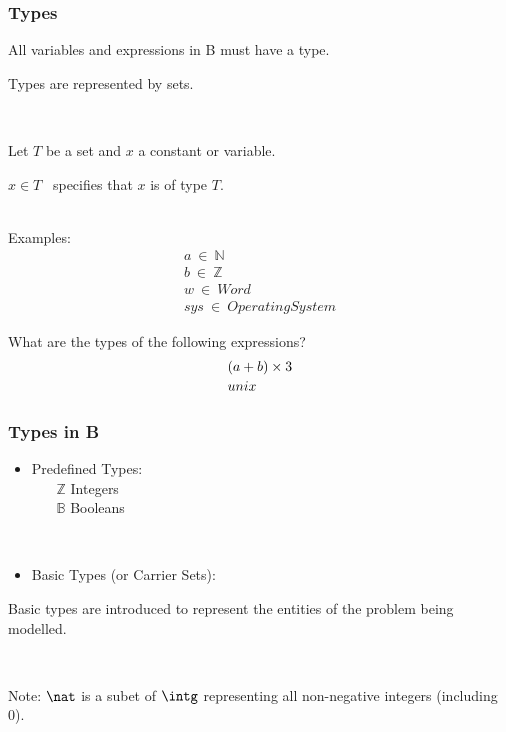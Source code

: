 \documentclass{beamer}
\begin{document}
\begin{frame}
\frametitle{Types}

All variables and expressions in B must have a \alert{type}.

Types are represented by sets.

~

Let $T$ be a set and $x$ a constant or variable.

\alert{$x \in T$}~ specifies that \alert{$x$ is of type $T$}.\\[2pt]

~

Examples:
\[\begin{array}{l}
    a~\in~\mathbb{N} \\
    b~\in~\mathbb{Z}\\
    w ~\in~ Word \\
    sys ~\in~ OperatingSystem
\end{array}\]

What are the types of the following expressions?
\[\begin{array}{l}
    (a+b)\times 3 \\[2pt]
    unix
\end{array}\]

\end{frame}






\begin{frame}

\frametitle{Types in B}
\begin{itemize}
\item
Predefined Types:\\
$~~~~~~~~\mathbb{Z}$  Integers\\

$~~~~~~~~\mathbb{B}$  Booleans 

~

\item Basic Types (or Carrier Sets):\\
$~~~~~~~~$ 
\end{itemize}

Basic types are  introduced to represent the entities of the problem being modelled.

~

Note: $\nat$ is a subet of $\intg$ representing all non-negative integers (including 0).

\end{frame}
\end{document}
